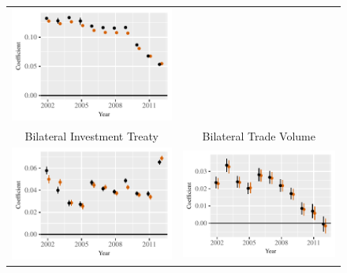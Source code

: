 \documentclass[reqno,onecolumn,letterpaper,12pt]{article}
\begin{document}
\begin{figure}[htp]
\begin{tabular}{c@{\hskip -.4cm}c}
\includegraphics[height=.2\textheight, clip=true, trim=.5cm .5cm 0cm .1cm]{draft_figures/rl_plots/GDPpc_out.pdf}   \\
Bilateral Investment Treaty &
Bilateral Trade Volume\\
\includegraphics[height=.2\textheight, clip=true, trim=0cm .5cm 0cm .1cm]{draft_figures/rl_plots/BIT.pdf}    &
\includegraphics[height=.2\textheight, clip=true, trim=.5cm .5cm 0cm .1cm]{draft_figures/rl_plots/TradeV.pdf}   \\

\end{tabular}
\end{figure}
\end{document}
